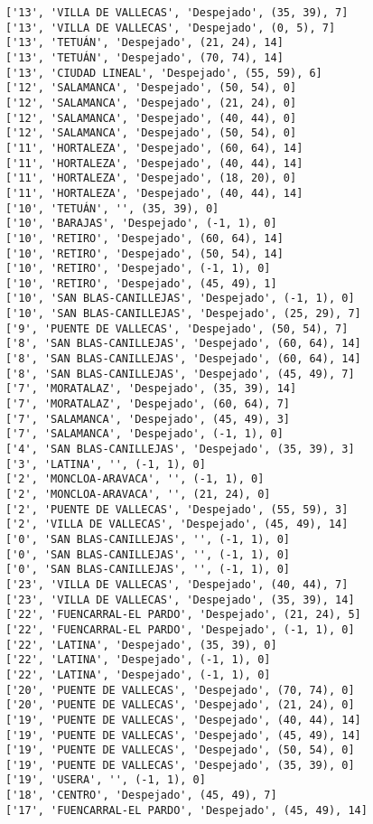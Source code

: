 \documentclass[11pt]{article}
\begin{document}
\begin{Verbatim}[commandchars=\\\{\}]
['13', 'VILLA DE VALLECAS', 'Despejado', (35, 39), 7]
['13', 'VILLA DE VALLECAS', 'Despejado', (0, 5), 7]
['13', 'TETUÁN', 'Despejado', (21, 24), 14]
['13', 'TETUÁN', 'Despejado', (70, 74), 14]
['13', 'CIUDAD LINEAL', 'Despejado', (55, 59), 6]
['12', 'SALAMANCA', 'Despejado', (50, 54), 0]
['12', 'SALAMANCA', 'Despejado', (21, 24), 0]
['12', 'SALAMANCA', 'Despejado', (40, 44), 0]
['12', 'SALAMANCA', 'Despejado', (50, 54), 0]
['11', 'HORTALEZA', 'Despejado', (60, 64), 14]
['11', 'HORTALEZA', 'Despejado', (40, 44), 14]
['11', 'HORTALEZA', 'Despejado', (18, 20), 0]
['11', 'HORTALEZA', 'Despejado', (40, 44), 14]
['10', 'TETUÁN', '', (35, 39), 0]
['10', 'BARAJAS', 'Despejado', (-1, 1), 0]
['10', 'RETIRO', 'Despejado', (60, 64), 14]
['10', 'RETIRO', 'Despejado', (50, 54), 14]
['10', 'RETIRO', 'Despejado', (-1, 1), 0]
['10', 'RETIRO', 'Despejado', (45, 49), 1]
['10', 'SAN BLAS-CANILLEJAS', 'Despejado', (-1, 1), 0]
['10', 'SAN BLAS-CANILLEJAS', 'Despejado', (25, 29), 7]
['9', 'PUENTE DE VALLECAS', 'Despejado', (50, 54), 7]
['8', 'SAN BLAS-CANILLEJAS', 'Despejado', (60, 64), 14]
['8', 'SAN BLAS-CANILLEJAS', 'Despejado', (60, 64), 14]
['8', 'SAN BLAS-CANILLEJAS', 'Despejado', (45, 49), 7]
['7', 'MORATALAZ', 'Despejado', (35, 39), 14]
['7', 'MORATALAZ', 'Despejado', (60, 64), 7]
['7', 'SALAMANCA', 'Despejado', (45, 49), 3]
['7', 'SALAMANCA', 'Despejado', (-1, 1), 0]
['4', 'SAN BLAS-CANILLEJAS', 'Despejado', (35, 39), 3]
['3', 'LATINA', '', (-1, 1), 0]
['2', 'MONCLOA-ARAVACA', '', (-1, 1), 0]
['2', 'MONCLOA-ARAVACA', '', (21, 24), 0]
['2', 'PUENTE DE VALLECAS', 'Despejado', (55, 59), 3]
['2', 'VILLA DE VALLECAS', 'Despejado', (45, 49), 14]
['0', 'SAN BLAS-CANILLEJAS', '', (-1, 1), 0]
['0', 'SAN BLAS-CANILLEJAS', '', (-1, 1), 0]
['0', 'SAN BLAS-CANILLEJAS', '', (-1, 1), 0]
['23', 'VILLA DE VALLECAS', 'Despejado', (40, 44), 7]
['23', 'VILLA DE VALLECAS', 'Despejado', (35, 39), 14]
['22', 'FUENCARRAL-EL PARDO', 'Despejado', (21, 24), 5]
['22', 'FUENCARRAL-EL PARDO', 'Despejado', (-1, 1), 0]
['22', 'LATINA', 'Despejado', (35, 39), 0]
['22', 'LATINA', 'Despejado', (-1, 1), 0]
['22', 'LATINA', 'Despejado', (-1, 1), 0]
['20', 'PUENTE DE VALLECAS', 'Despejado', (70, 74), 0]
['20', 'PUENTE DE VALLECAS', 'Despejado', (21, 24), 0]
['19', 'PUENTE DE VALLECAS', 'Despejado', (40, 44), 14]
['19', 'PUENTE DE VALLECAS', 'Despejado', (45, 49), 14]
['19', 'PUENTE DE VALLECAS', 'Despejado', (50, 54), 0]
['19', 'PUENTE DE VALLECAS', 'Despejado', (35, 39), 0]
['19', 'USERA', '', (-1, 1), 0]
['18', 'CENTRO', 'Despejado', (45, 49), 7]
['17', 'FUENCARRAL-EL PARDO', 'Despejado', (45, 49), 14]

\end{Verbatim}
\end{document}
